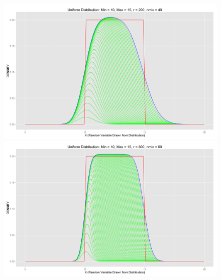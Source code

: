 \documentclass[letter]{article}
\begin{document}
\begin{figure}[H]
\includegraphics[scale=.27]{unifdist_10_15_200_40.png}\\
\includegraphics[scale=.54]{unifdist_10_15_800_60.png}
\end{figure}
\end{document}
